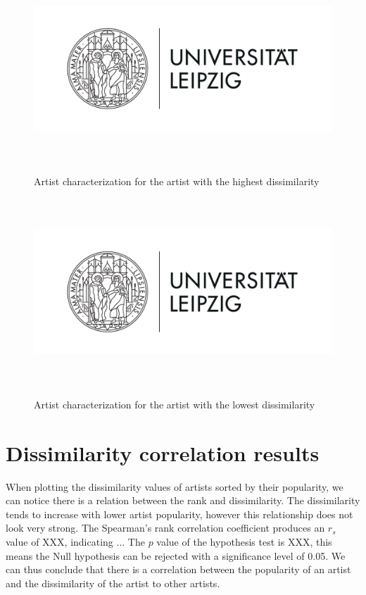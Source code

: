 \begin{figure}[h]
    \begin{center}
        \includegraphics[height=7cm]{Bilder/artist_highest_dissimilarity.png}\\[2.5ex]
    \end{center}
\caption{Artist characterization for the artist with the highest dissimilarity}
\end{figure}

\begin{figure}[h]
    \begin{center}
        \includegraphics[height=7cm]{Bilder/artist_lowest_dissimilarity.png}\\[2.5ex]
    \end{center}
\caption{Artist characterization for the artist with the lowest dissimilarity}
\label{fig:lowest_dissimilarity}
\end{figure}


\section{Dissimilarity correlation results}

When plotting the dissimilarity values of artists sorted by their popularity, we can notice there is a relation between the rank and dissimilarity. The dissimilarity tends to increase with lower artist popularity, however this relationship does not look very strong.
The Spearman's rank correlation coefficient produces an \(r_s\) value of XXX, indicating ...
The \(p\) value of the hypothesis test is XXX, this means the Null hypothesis can be rejected with a significance level of 0.05. We can thus conclude that there is a correlation between the popularity of an artist and the dissimilarity of the artist to other artists.

